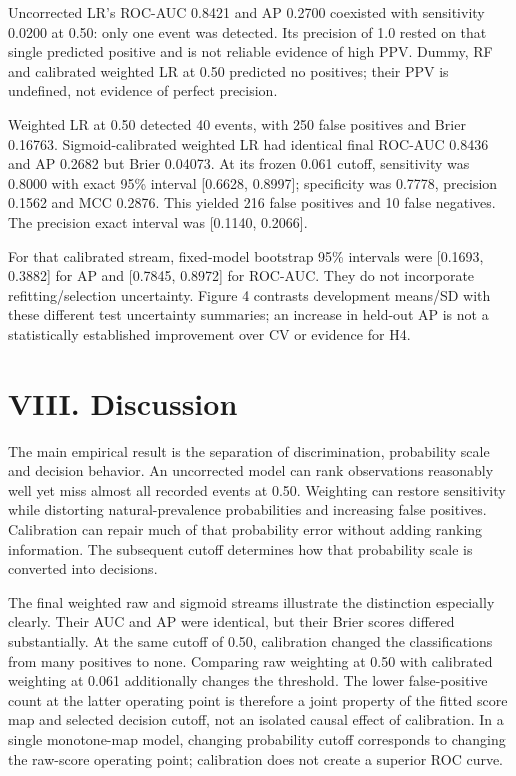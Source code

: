 \documentclass[10pt,twocolumn,letterpaper]{article}
\begin{document}
Uncorrected LR's ROC-AUC 0.8421 and AP 0.2700 coexisted with sensitivity 0.0200 at 0.50: only one event was detected. Its precision of 1.0 rested on that single predicted positive and is not reliable evidence of high PPV. Dummy, RF and calibrated weighted LR at 0.50 predicted no positives; their PPV is undefined, not evidence of perfect precision.


Weighted LR at 0.50 detected 40 events, with 250 false positives and Brier 0.16763. Sigmoid-calibrated weighted LR had identical final ROC-AUC 0.8436 and AP 0.2682 but Brier 0.04073. At its frozen 0.061 cutoff, sensitivity was 0.8000 with exact 95\% interval [0.6628, 0.8997]; specificity was 0.7778, precision 0.1562 and MCC 0.2876. This yielded 216 false positives and 10 false negatives. The precision exact interval was [0.1140, 0.2066].


For that calibrated stream, fixed-model bootstrap 95\% intervals were [0.1693, 0.3882] for AP and [0.7845, 0.8972] for ROC-AUC. They do not incorporate refitting/selection uncertainty. Figure 4 contrasts development means/SD with these different test uncertainty summaries; an increase in held-out AP is not a statistically established improvement over CV or evidence for H4.


\section*{VIII. Discussion}
The main empirical result is the separation of discrimination, probability scale and decision behavior. An uncorrected model can rank observations reasonably well yet miss almost all recorded events at 0.50. Weighting can restore sensitivity while distorting natural-prevalence probabilities and increasing false positives. Calibration can repair much of that probability error without adding ranking information. The subsequent cutoff determines how that probability scale is converted into decisions.


The final weighted raw and sigmoid streams illustrate the distinction especially clearly. Their AUC and AP were identical, but their Brier scores differed substantially. At the same cutoff of 0.50, calibration changed the classifications from many positives to none. Comparing raw weighting at 0.50 with calibrated weighting at 0.061 additionally changes the threshold. The lower false-positive count at the latter operating point is therefore a joint property of the fitted score map and selected decision cutoff, not an isolated causal effect of calibration. In a single monotone-map model, changing probability cutoff corresponds to changing the raw-score operating point; calibration does not create a superior ROC curve.
\end{document}
